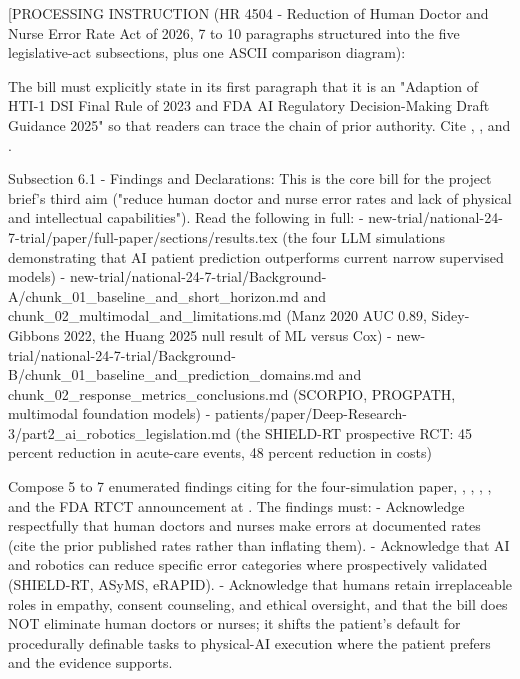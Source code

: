 
[PROCESSING INSTRUCTION (HR 4504 - Reduction of Human Doctor and Nurse
Error Rate Act of 2026, 7 to 10 paragraphs structured into the five
legislative-act subsections, plus one ASCII comparison diagram):

The bill must explicitly state in its first paragraph that it is an
"Adaption of HTI-1 DSI Final Rule of 2023 and FDA AI Regulatory
Decision-Making Draft Guidance 2025" so that readers can trace the
chain of prior authority. Cite \cite{rank9_onc_hti1_2023},
\cite{hti1_dsi_fact_sheet_2023}, and
\cite{fda_ai_regulatory_decision_draft_2025}.

Subsection 6.1 - Findings and Declarations: This is the core bill for
the project brief's third aim ("reduce human doctor and nurse error
rates and lack of physical and intellectual capabilities"). Read the
following in full:
- new-trial/national-24-7-trial/paper/full-paper/sections/results.tex
  (the four LLM simulations demonstrating that AI patient prediction
  outperforms current narrow supervised models)
- new-trial/national-24-7-trial/Background-A/chunk\_01\_baseline\_and\_short\_horizon.md
  and chunk\_02\_multimodal\_and\_limitations.md (Manz 2020 AUC 0.89,
  Sidey-Gibbons 2022, the Huang 2025 null result of ML versus Cox)
- new-trial/national-24-7-trial/Background-B/chunk\_01\_baseline\_and\_prediction\_domains.md
  and chunk\_02\_response\_metrics\_conclusions.md (SCORPIO, PROGPATH,
  multimodal foundation models)
- patients/paper/Deep-Research-3/part2\_ai\_robotics\_legislation.md
  (the SHIELD-RT prospective RCT: 45 percent reduction in acute-care
  events, 48 percent reduction in costs)

Compose 5 to 7 enumerated findings citing
\cite{kawchak_2026_19994945} for the four-simulation paper,
\cite{vorontsov2024virchow}, \cite{rocque2025remote_symptom_monitoring},
\cite{gonzalez2025bayesian_urgent_care_nsclc},
\cite{mazor2025ai_notifications_trial}, and the FDA RTCT announcement
at \cite{fda_rtct_press_2026}. The findings must:
- Acknowledge respectfully that human doctors and nurses make errors
  at documented rates (cite the prior published rates rather than
  inflating them).
- Acknowledge that AI and robotics can reduce specific error
  categories where prospectively validated (SHIELD-RT, ASyMS,
  eRAPID).
- Acknowledge that humans retain irreplaceable roles in empathy,
  consent counseling, and ethical oversight, and that the bill does
  NOT eliminate human doctors or nurses; it shifts the patient's
  default for procedurally definable tasks to physical-AI execution
  where the patient prefers and the evidence supports.

